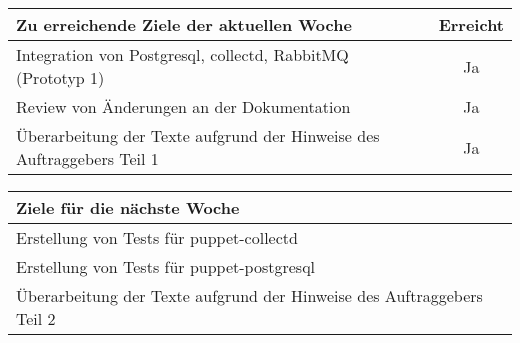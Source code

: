 \begin{tabularx}{\textwidth}{Xc}
    \arrayrulecolor{OliveGreen}
    \toprule
    {\bfseries Zu erreichende Ziele der aktuellen Woche} & {\bfseries Erreicht} \\
    \midrule[2pt]
    Integration von Postgresql, collectd, RabbitMQ (Prototyp 1) &Ja             \\
    \rowcolor{OliveGreen!15}
    Review von Änderungen an der Dokumentation           &Ja                    \\
    \rowcolor{White}
    Überarbeitung der Texte aufgrund der Hinweise des Auftraggebers Teil 1 &Ja  \\
    \bottomrule[2pt]
\end{tabularx}
%
\vspace{1cm}
%
\begin{tabularx}{\textwidth}{Xc}
    \arrayrulecolor{OliveGreen}
    \toprule
    {\bfseries Ziele für die nächste Woche}              &                      \\
    \midrule[2pt]
    Erstellung von Tests für puppet-collectd             &                      \\
    \rowcolor{OliveGreen!15}
    Erstellung von Tests für puppet-postgresql           &                      \\
    \rowcolor{White}
    Überarbeitung der Texte aufgrund der Hinweise des Auftraggebers Teil 2 &    \\
\end{tabularx}
